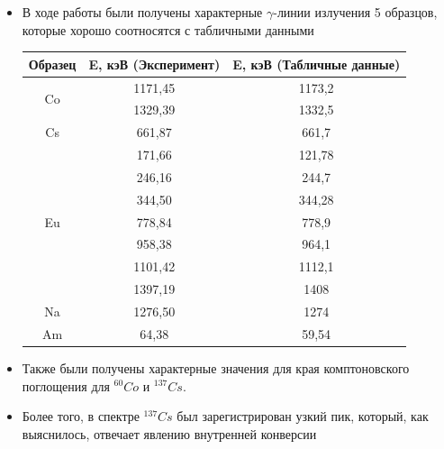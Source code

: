 \documentclass[a4paper,12pt]{article}
\begin{document}
\begin{itemize}
\item В ходе работы были получены характерные $\gamma$-линии излучения 5 образцов, которые хорошо соотносятся с табличными данными 

\begin{table}[h!]
\centering
\begin{tabular}{|c|c|c|}
\hline
Образец & E, кэВ (Эксперимент) & E, кэВ (Табличные данные) \\ \hline
\multirow{2}{*}{Co} & 1171,45 & 1173,2 \\ \cline{2-3} 
 & 1329,39 & 1332,5 \\ \hline
Cs & 661,87 & 661,7 \\ \hline
\multirow{7}{*}{Eu} & 171,66 & 121,78 \\ \cline{2-3} 
 & 246,16 & 244,7 \\ \cline{2-3} 
 & 344,50 & 344,28 \\ \cline{2-3} 
 & 778,84 & 778,9 \\ \cline{2-3} 
 & 958,38 & 964,1 \\ \cline{2-3} 
 & 1101,42 & 1112,1 \\ \cline{2-3} 
 & 1397,19 & 1408 \\ \hline
Na & 1276,50 & 1274 \\ \hline
Am & 64,38 & 59,54 \\ \hline
\end{tabular}
\end{table}

\item Также были получены характерные значения для края комптоновского поглощения для $^{60}Co$ и $^{137}Cs$.

\item Более того, в спектре $^{137}Cs$ был зарегистрирован узкий пик, который, как выяснилось, отвечает явлению внутренней конверсии

\end{itemize} 
 
\end{document}
